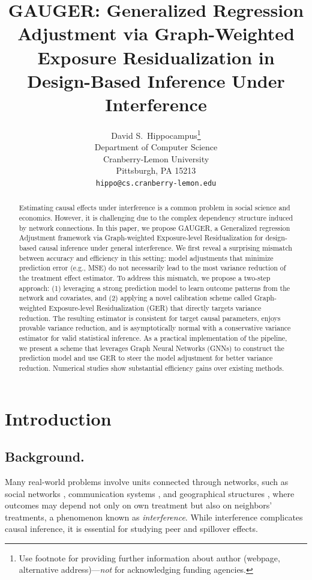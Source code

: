 \documentclass[twoside,letterpaper]{article}
\title{GAUGER: Generalized Regression Adjustment via Graph-Weighted Exposure Residualization in Design-Based Inference Under Interference}
\author{%
  David S.~Hippocampus\thanks{Use footnote for providing further information
    about author (webpage, alternative address)---\emph{not} for acknowledging
    funding agencies.} \\
  Department of Computer Science\\
  Cranberry-Lemon University\\
  Pittsburgh, PA 15213 \\
  \texttt{hippo@cs.cranberry-lemon.edu} \\
}
\theoremstyle{plain}
\theoremstyle{definition}
\theoremstyle{remark}
\begin{document}


\begin{abstract}
 Estimating causal effects under interference is a common problem in social science and economics. However, it is challenging due to the complex dependency structure induced by network connections. In this paper, we propose GAUGER, a Generalized regression Adjustment framework via Graph-weighted Exposure-level Residualization for design-based causal inference under general interference. We first reveal a surprising mismatch between accuracy and efficiency in this setting: model adjustments that minimize prediction error (e.g., MSE) do not necessarily lead to the most variance reduction of the treatment effect estimator. To address this mismatch, we propose a two-step approach: (1) leveraging a strong prediction model to learn outcome patterns from the network and covariates, and (2) applying a novel calibration scheme called Graph-weighted Exposure-level Residualization (GER) that directly targets variance reduction. The resulting estimator is consistent for target causal parameters, enjoys provable variance reduction, and is asymptotically normal with a conservative variance estimator for valid statistical inference. As a practical implementation of the pipeline, we present a scheme that leverages Graph Neural Networks (GNNs) to construct the prediction model and use GER to steer the model adjustment for better variance reduction. Numerical studies show substantial efficiency gains over existing methods.
\end{abstract}



\section{Introduction}

\subsection{Background.}
Many real-world problems involve units connected through networks, such as social networks \citep{freeman2004development}, communication systems \citep{shaw1964communication}, and geographical structures \citep{rolnick2019randomized}, where outcomes may depend not only on own treatment but also on neighbors’ treatments, a phenomenon known as \emph{interference}. While interference complicates causal inference, it is essential for studying peer and spillover effects.
\end{document}
